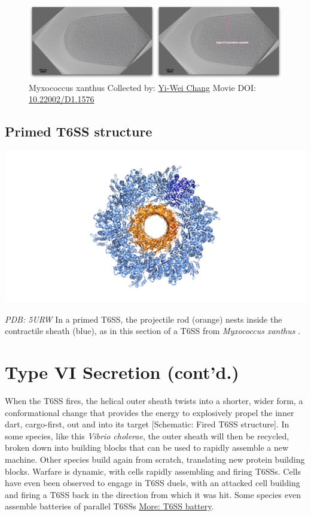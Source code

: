\documentclass[]{tufte-book}
\begin{document}
\begin{figure}
\includegraphics{movie_stills/9_6} \caption[Myxococcus xanthus Collected by:
\protect\hyperlink{yi-wei_chang}{Yi-Wei Chang} Movie DOI:
\href{https://doi.org/10.22002/D1.1576}{10.22002/D1.1576}]{Myxococcus xanthus Collected by:
\protect\hyperlink{yi-wei_chang}{Yi-Wei Chang} Movie DOI:
\href{https://doi.org/10.22002/D1.1576}{10.22002/D1.1576}}\label{fig:9-6}
\end{figure}

\subsection{Primed T6SS structure}\label{Primed_T6SS_structure}

\includegraphics{img/schematics/9_6_1}

\emph{PDB: 5URW} In a primed T6SS, the projectile rod (orange) nests
inside the contractile sheath (blue), as in this section of a T6SS from
\emph{Myxococcus xanthus} \citep{chang2017}.

\section{Type VI Secretion (cont'd.)}\label{type-vi-secretion-contd.}

When the T6SS fires, the helical outer sheath twists into a shorter,
wider form, a conformational change that provides the energy to
explosively propel the inner dart, cargo-first, out and into its target
{[}Schematic: Fired T6SS structure{]}. In some species, like this
\emph{Vibrio cholerae}, the outer sheath will then be recycled, broken
down into building blocks that can be used to rapidly assemble a new
machine. Other species build again from scratch, translating new protein
building blocks. Warfare is dynamic, with cells rapidly assembling and
firing T6SSs. Cells have even been observed to engage in T6SS duels,
with an attacked cell building and firing a T6SS back in the direction
from which it was hit. Some species even assemble batteries of parallel
T6SSs \protect\hyperlink{T6SS_battery}{More: T6SS battery}.
\end{document}
